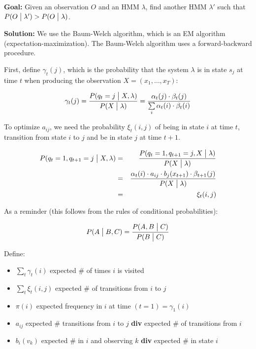 \textbf{Goal:} Given an observation $O$ and an HMM $\lambda$, find another HMM $\lambda'$ such that $P(O \bigm| \lambda') > P(O \bigm| \lambda)$.

\textbf{Solution:} We use the Baum-Welch algorithm, which is an EM algorithm (expectation-maximization). The Baum-Welch algorithm uses a forward-backward procedure.

First, define $\gamma_t(j)$, which is the probability that the system $\lambda$ is in state $s_j$ at time $t$ when producing the observation $X = (x_1, \ldots, x_T)$:

\begin{equation}
    \gamma_t(j) = \frac{P(q_t = j \bigm| X, \lambda)}{P(X \bigm| \lambda)} = \frac{\alpha_t(j) \cdot \beta_t(j)}{\sum\limits_i \alpha_t(i) \cdot \beta_t(i)}
\end{equation}

To optimize $a_{ij}$, we need the probability $\xi_t(i, j)$ of being in state $i$ at time $t$, transition from state $i$ to $j$ and be in state $j$ at time $t+1$.

\begin{eqnarray*}
    P(q_t = 1, q_{t+1} = j \bigm| X, \lambda) &=& \frac{P(q_t = 1, q_{t+1} = j, X \bigm| \lambda)}{P(X \bigm| \lambda)} \\
                                              &=& \frac{\alpha_t(i) \cdot a_{ij} \cdot b_j(x_{t+1}) \cdot \beta_{t+1}(j)}{P(X \bigm| \lambda)} \\
                                              &=& \xi_t(i, j)
\end{eqnarray*}

As a reminder (this follows from the rules of conditional probabilities):

\begin{equation}
    P(A \bigm| B, C) = \frac{P(A, B \bigm| C)}{P(B \bigm| C)}
\end{equation}

Define:
\begin{itemize}
    \item $\sum\limits_t \gamma_t(i)$ expected \# of times $i$ is visited
    \item $\sum\limits_t \xi_t(i, j)$ expected \# of transitions from $i$ to $j$
    \item $\pi(i)$ expected frequency in $i$ at time $(t = 1) = \gamma_1(i)$
    \item $a_{ij}$ expected \# transitions from $i$ to $j$ \textbf{div} expected \# of transitions from $i$
    \item $b_i(v_k)$ expected \# in $i$ and observing $k$ \textbf{div} expected \# in state $i$
\end{itemize}

